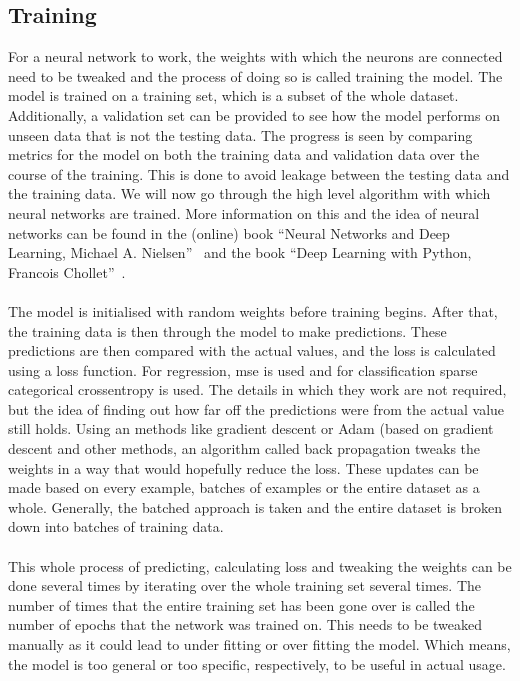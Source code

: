 \documentclass[12pt]{article}
\begin{document}
\subsection{Training}\label{subsec:training}
For a neural network to work, the weights with which the neurons are connected need to be tweaked and the process of doing so is called training the model. The model is trained on a training set, which is a subset of the whole dataset. Additionally, a validation set can be provided to see how the model performs on unseen data that is not the testing data. The progress is seen by comparing metrics for the model on both the training data and validation data over the course of the training. This is done to avoid leakage between the testing data and the training data. We will now go through the high level algorithm with which neural networks are trained. More information on this and the idea of neural networks can be found in the (online) book ``Neural Networks and Deep Learning, Michael A. Nielsen''~\cite{neuralnets} and the book ``Deep Learning with Python, Francois Chollet''~\cite{deeplearning}.
\\\\
The model is initialised with random weights before training begins. After that, the training data is then through the model to make predictions. These predictions are then compared with the actual values, and the loss is calculated using a loss function. For regression, mse is used and for classification sparse categorical crossentropy is used. The details in which they work are not required, but the idea of finding out how far off the predictions were from the actual value still holds. Using an methods like gradient descent or Adam (based on gradient descent and other methods, an algorithm called back propagation tweaks the weights in a way that would hopefully reduce the loss. These updates can be made based on every example, batches of examples or the entire dataset as a whole. Generally, the batched approach is taken and the entire dataset is broken down into batches of training data. 
\\\\
This whole process of predicting, calculating loss and tweaking the weights can be done several times by iterating over the whole training set several times. The number of times that the entire training set has been gone over is called the number of epochs that the network was trained on. This needs to be tweaked manually as it could lead to under fitting or over fitting the model. Which means, the model is too general or too specific, respectively, to be useful in actual usage.
\end{document}
